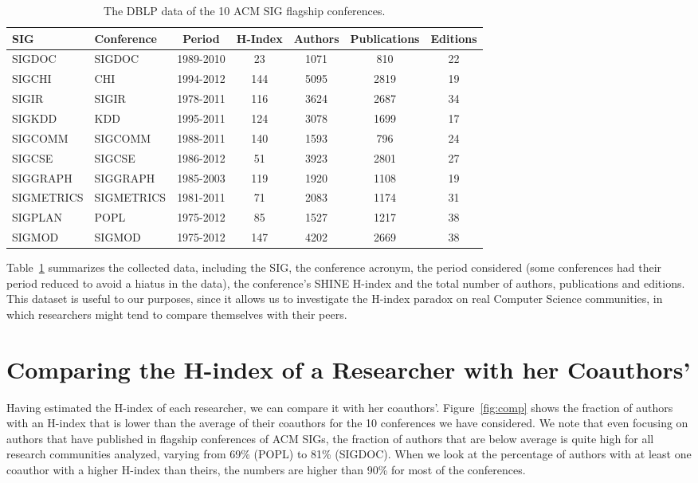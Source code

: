 \documentclass[smallextended]{svjour3}
\begin{document}
\begin{table}[t]
\centering
\caption{The DBLP data of the 10 ACM SIG flagship conferences.}
\label{tab:sigs_conference_period}
{\small
\begin{tabular}{|l|l|c|c|c|c|c|} \hline
SIG & Conference & Period & H-Index & Authors & Publications & Editions \\ \hline
SIGDOC & SIGDOC & 1989-2010 & 23 & 1071 & 810 & 22 \\ \hline
SIGCHI & CHI & 1994-2012 & 144 & 5095 & 2819 & 19 \\ \hline
SIGIR & SIGIR & 1978-2011 & 116 & 3624 & 2687 & 34 \\ \hline
SIGKDD & KDD & 1995-2011 & 124 & 3078 & 1699 & 17 \\ \hline
SIGCOMM & SIGCOMM & 1988-2011 & 140 & 1593 & 796 & 24 \\ \hline
SIGCSE & SIGCSE & 1986-2012 & 51 & 3923 & 2801 & 27 \\ \hline
SIGGRAPH & SIGGRAPH & 1985-2003 & 119 & 1920 & 1108 & 19 \\ \hline
SIGMETRICS & SIGMETRICS & 1981-2011 & 71 & 2083 & 1174 & 31  \\ \hline
SIGPLAN & POPL & 1975-2012 & 85 & 1527 & 1217 & 38  \\ \hline
SIGMOD & SIGMOD & 1975-2012 & 147 & 4202 & 2669 & 38  \\ \hline
\end{tabular}
}
\end{table}


Table~\ref{tab:sigs_conference_period} summarizes the collected data, including the SIG, the conference acronym, the period considered (some conferences had their period reduced to avoid a hiatus in the data), the conference's SHINE H-index and the total number of authors, publications and editions. This dataset is useful to our purposes, since it allows us to investigate the H-index paradox on real Computer Science communities, in which researchers might tend to compare themselves with their peers.


\section{Comparing the H-index of a Researcher with her Coauthors'}



Having estimated the H-index of each researcher, we can compare it with her coauthors'. Figure~\ref{fig:comp} shows the fraction of authors with an H-index that is lower than the average of their coauthors for the 10 conferences we have considered. We note that even focusing on authors that have published in flagship conferences of ACM SIGs, the fraction of authors that are below average is quite high for all research communities analyzed, varying from 69\% (POPL) to 81\% (SIGDOC). When we look at the percentage of authors with at least one coauthor with a higher H-index than theirs, the numbers are higher than 90\% for most of the conferences.
\end{document}
